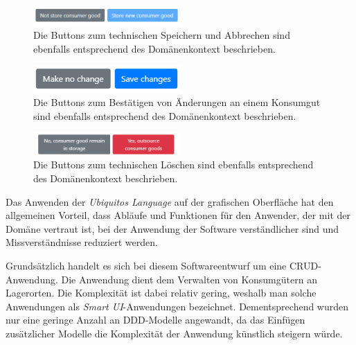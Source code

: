 \begin{figure}[H]
	\centering
	\includegraphics[width=0.5\textwidth]{Bilder/gui/Ubiquitous Language/store-buttons.PNG}
	\caption[Buttons zum Bestätigen des Einlagerns eines Konsumguts.]{Die Buttons zum technischen Speichern und Abbrechen sind ebenfalls entsprechend des Domänenkontext beschrieben.}
	\label{fig:gui-button-einlagern}
\end{figure}

\begin{figure}[H]
	\centering
	\includegraphics[width=0.5\textwidth]{Bilder/gui/Ubiquitous Language/edit-buttons.PNG}
	\caption[Buttons zum Bestätigen von Änderungen der Attribute eines Konsumguts.]{Die Buttons zum Bestätigen von Änderungen an einem Konsumgut sind ebenfalls entsprechend des Domänenkontext beschrieben.}
	\label{fig:gui-button-aendern}
\end{figure}

\begin{figure}[H]
	\centering
	\includegraphics[width=0.5\textwidth]{Bilder/gui/Ubiquitous Language/outsource-buttons.PNG}
	\caption[Buttons zum Bestätigen des Auslagern eines Konsumguts.]{Die Buttons zum technischen Löschen sind ebenfalls entsprechend des Domänenkontext beschrieben.}
	\label{fig:gui-button-auslagern}
\end{figure}

Das Anwenden der \textit{Ubiquitos Language} auf der grafischen Oberfläche hat den allgemeinen Vorteil, dass Abläufe und Funktionen für den Anwender, der mit der Domäne vertraut ist, bei der Anwendung der Software verständlicher sind und Missverständnisse reduziert werden.

Grundsätzlich handelt es sich bei diesem Softwareentwurf um eine \ac{CRUD}-Anwendung.
Die Anwendung dient dem Verwalten von Konsumgütern an Lagerorten.
Die Komplexität ist dabei relativ gering, weshalb man solche Anwendungen als \textit{Smart UI}-Anwendungen bezeichnet.
Dementsprechend wurden nur eine geringe Anzahl an \ac{DDD}-Modelle angewandt, da das Einfügen zusätzlicher Modelle die Komplexität der Anwendung künstlich steigern würde.

